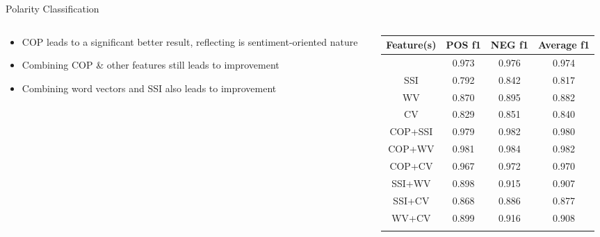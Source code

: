 \documentclass[compress]{beamer}
\begin{document}
        \begin{frame}{Polarity Classification}
            \begin{columns}
                \begin{column}[T]{.5\textwidth}
                    \begin{itemize}
                        \item<1-> COP leads to a significant better result, reflecting is sentiment-oriented nature
                        \item<2-> Combining COP \& other features still leads to improvement
                        \item<3-> Combining word vectors and SSI also leads to improvement %
                    \end{itemize}
                \end{column}
                \begin{column}[T]{.6\textwidth}
                    \begin{table}
                    \small
                    \centering
                    \tabcolsep=0.1cm
                    \begin{tabular}{cccc}
                    \hline
                    Feature(s) & POS f1 & NEG f1 & Average f1 \\ \hline
                    \only<1>{
                        COP        & 0.973  & 0.976  & \cellcolor{red}0.974      \\ \hline
                        SSI        & 0.792  & 0.842  & 0.817      \\ \hline
                        WV         & 0.870  & 0.895  & 0.882      \\ \hline
                        CV         & 0.829  & 0.851  & 0.840      \\ \hline
                        COP+SSI    & 0.979  & 0.982  & 0.980      \\ \hline
                        COP+WV     & 0.981  & 0.984  & 0.982      \\ \hline
                        COP+CV     & 0.967  & 0.972  & 0.970      \\ \hline
                        SSI+WV     & 0.898  & 0.915  & 0.907      \\ \hline
                        SSI+CV     & 0.868  & 0.886  & 0.877      \\ \hline
                        WV+CV      & 0.899  & 0.916  & 0.908      \\ \hline
}
\end{tabular}
\end{table}
\end{column}
\end{columns}
\end{frame}
\end{document}
